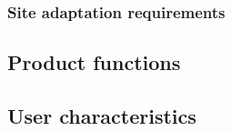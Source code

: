 \subsubsection{Site adaptation requirements}


\subsection{Product functions}

% 

\subsection{User characteristics}


